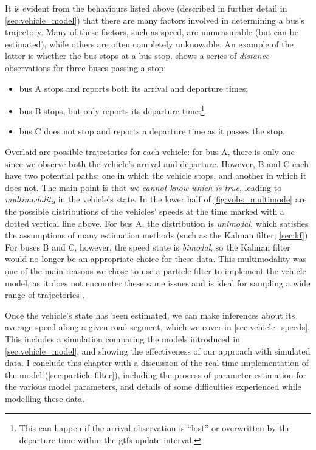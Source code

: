 It is evident from the behaviours listed above (described in further detail in \cref{sec:vehicle_model}) that there are many factors involved in determining a bus's trajectory. Many of these factors, such as speed, are unmeasurable (but can be estimated), while others are often completely unknowable. An example of the latter is whether the bus stops at a bus stop.  shows a series of \emph{distance} observations for three buses passing a stop:
\begin{itemize}
\item bus A stops and reports both its arrival and departure times;
\item bus B stops, but only reports its departure time;\footnote{This can happen if the arrival observation is ``lost'' or overwritten by the departure time within the \gls{gtfs} update interval.}
\item bus C does not stop and reports a departure time as it passes the stop.
\end{itemize}
Overlaid are possible trajectories for each vehicle: for bus A, there is only one since we observe both the vehicle's arrival and departure. However, B and C each have two potential paths: one in which the vehicle stops, and another in which it does not. The main point is that \emph{we cannot know which is true}, leading to \emph{multimodality} in the vehicle's state. In the lower half of \cref{fig:vobs_multimode} are the possible distributions of the vehicles' speeds at the time marked with a dotted vertical line above. For bus A, the distribution is \emph{unimodal}, which satisfies the assumptions of many estimation methods (such as the Kalman filter, \cref{sec:kf}). For buses B and C, however, the speed state is \emph{bimodal}, so the Kalman filter would no longer be an appropriate choice for these data. This multimodality was one of the main reasons we chose to use a particle filter to implement the vehicle model, as it does not encounter these same issues and is ideal for sampling a wide range of trajectories \citep{Hans_2015}.

Once the vehicle's state has been estimated, we can make inferences about its average speed along a given road segment, which we cover in \cref{sec:vehicle_speeds}. This includes a simulation comparing the models introduced in \cref{sec:vehicle_model}, and showing the effectiveness of our approach with simulated data. I conclude this chapter with a discussion of the real-time implementation of the model (\cref{sec:particle-filter}), including the process of parameter estimation for the various model parameters, and details of some difficulties experienced while modelling these data.










